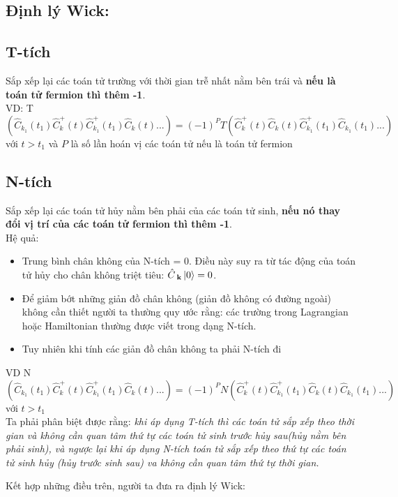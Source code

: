 \documentclass{report}
\begin{document}
\subsection{Định lý Wick:}

\subsection*{T-tích}
Sắp xếp lại các toán tử trường với thời gian trễ nhất nằm bên trái và \textbf{nếu là toán tử fermion thì thêm -1}.\\
VD: T$\left(\hat{C}_{k_1}(t_1)\hat{C}^{+}_{k}(t)\hat{C}^{+}_{k_1}(t_1)\hat{C}_{k}(t)... \right) = (-1)^{P}T\left(\hat{C}^{+}_{k}(t)\hat{C}_{k}(t)\hat{C}^{+}_{k_1}(t_1)\hat{C}_{k_1}(t_1)... \right) $ với $t>t_1$ và $P$ là số lần hoán vị các toán tử nếu là toán tử fermion
\subsection*{N-tích}
Sắp xếp lại các toán tử hủy nằm bên phải của các toán tử sinh, \textbf{nếu nó thay đổi vị trí của các toán tử fermion thì thêm -1}.\\
Hệ quả:
\begin{itemize}
	\item Trung bình chân không của N-tích = 0. Điều này suy ra từ tác động của toán tử hủy cho chân không triệt tiêu: $\hat{C}_{\;\mathbf{k}} \ket{0} = 0$.
	\item Để giảm bớt những giản đồ chân không (giản đồ không có đường ngoài) không cần thiết người ta thường quy ước rằng: các trường trong Lagrangian hoặc Hamiltonian thường được viết trong dạng N-tích.
	\item Tuy nhiên khi tính các giản đồ chân không ta phải N-tích đi
\end{itemize}
VD N$\left(\hat{C}_{k_1}(t_1)\hat{C}^{+}_{k}(t)\hat{C}^{+}_{k_1}(t_1)\hat{C}_{k}(t)... \right) = (-1)^{P}N\left(\hat{C}^{+}_{k}(t)\hat{C}^{+}_{k_1}(t_1)\hat{C}_{k}(t)\hat{C}_{k_1}(t_1)... \right) $ với $t>t_1$\\
Ta phải phân biệt được rằng: \textit{ khi áp dụng T-tích thì các toán tử sắp xếp theo thời gian và không cần quan tâm thứ tự các toán tử sinh trước hủy sau(hủy nằm bên phải sinh), và ngược lại khi áp dụng N-tích toán tử sắp xếp theo thứ tự các toán tử sinh hủy (hủy trước sinh sau) va không cần quan tâm thứ tự thời gian.}

Kết hợp những điều trên, người ta đưa ra định lý Wick:
\end{document}
